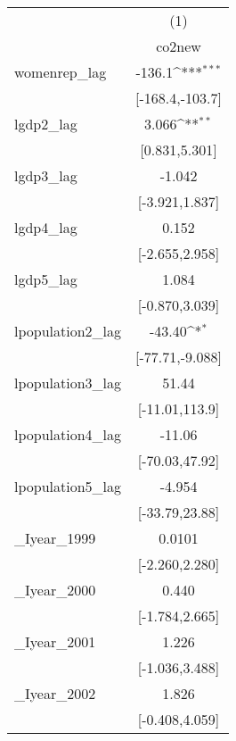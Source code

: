 {
\def\sym#1{\ifmmode^{#1}\else\(^{#1}\)\fi}
\begin{tabular}{l*{1}{c}}
\hline\hline
            &\multicolumn{1}{c}{(1)}        \\
            &\multicolumn{1}{c}{co2new}     \\
\hline
womenrep\_lag&                -136.1\sym{***}\\
            &       [-168.4,-103.7]         \\
[1em]
lgdp2\_lag   &                 3.066\sym{**} \\
            &         [0.831,5.301]         \\
[1em]
lgdp3\_lag   &                -1.042         \\
            &        [-3.921,1.837]         \\
[1em]
lgdp4\_lag   &                 0.152         \\
            &        [-2.655,2.958]         \\
[1em]
lgdp5\_lag   &                 1.084         \\
            &        [-0.870,3.039]         \\
[1em]
lpopulation2\_lag&                -43.40\sym{*}  \\
            &       [-77.71,-9.088]         \\
[1em]
lpopulation3\_lag&                 51.44         \\
            &        [-11.01,113.9]         \\
[1em]
lpopulation4\_lag&                -11.06         \\
            &        [-70.03,47.92]         \\
[1em]
lpopulation5\_lag&                -4.954         \\
            &        [-33.79,23.88]         \\
[1em]
\_Iyear\_1999 &                0.0101         \\
            &        [-2.260,2.280]         \\
[1em]
\_Iyear\_2000 &                 0.440         \\
            &        [-1.784,2.665]         \\
[1em]
\_Iyear\_2001 &                 1.226         \\
            &        [-1.036,3.488]         \\
[1em]
\_Iyear\_2002 &                 1.826         \\
            &        [-0.408,4.059]         \\

\end{tabular}}
